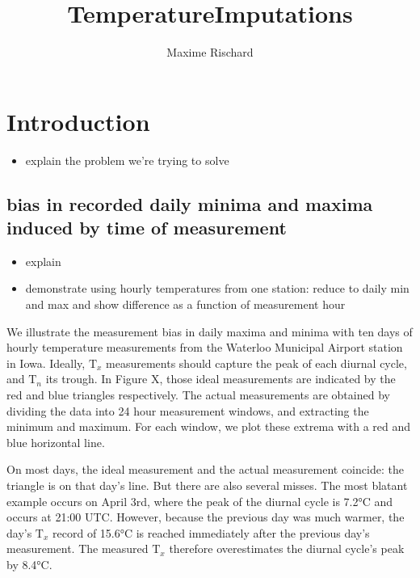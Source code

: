 \documentclass[letter]{article}
\title{TemperatureImputations}
\author{Maxime Rischard}
\providecommand{\tightlist}{%
      \setlength{\itemsep}{0pt}\setlength{\parskip}{0pt}}
\newcommand{\Tn}{\mathrm{T}_{n}}
\newcommand{\Tx}{\mathrm{T}_{x}}
\providecommand{\tightlist}{%
  	  \setlength{\itemsep}{0pt}\setlength{\parskip}{0pt}}
\begin{document}
    
    
    
    \maketitle
    
    
	\tableofcontents


    







    	\section{Introduction}\label{introduction}

\begin{itemize}
\tightlist
\item
  explain the problem we're trying to solve
\end{itemize}

\subsection{bias in recorded daily minima and maxima induced by time of
measurement}\label{bias-in-recorded-daily-minima-and-maxima-induced-by-time-of-measurement}

\begin{itemize}
\tightlist
\item
  explain
\item
  demonstrate using hourly temperatures from one station: reduce to
  daily min and max and show difference as a function of measurement
  hour
\end{itemize}
    


    	We illustrate the measurement bias in daily maxima and minima with ten
days of hourly temperature measurements from the Waterloo Municipal
Airport station in Iowa. Ideally, \(\Tx\) measurements should capture
the peak of each diurnal cycle, and \(\Tn\) its trough. In Figure X,
those ideal measurements are indicated by the red and blue triangles
respectively. The actual measurements are obtained by dividing the data
into 24 hour measurement windows, and extracting the minimum and
maximum. For each window, we plot these extrema with a red and blue
horizontal line.

On most days, the ideal measurement and the actual measurement coincide:
the triangle is on that day's line. But there are also several misses.
The most blatant example occurs on April 3rd, where the peak of the
diurnal cycle is 7.2°C and occurs at 21:00 UTC. However, because the
previous day was much warmer, the day's \(\Tx\) record of 15.6°C is
reached immediately after the previous day's measurement. The measured
\(\Tx\) therefore overestimates the diurnal cycle's peak by 8.4°C.
    
\end{document}
